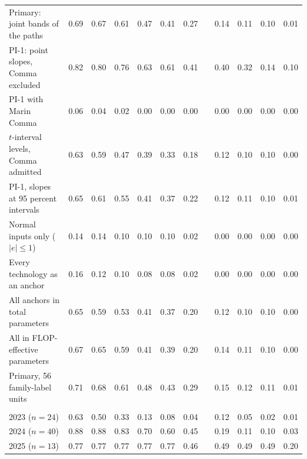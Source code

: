 \begin{table}[tp]
\begin{tabular*}{\textwidth}{@{\extracolsep{\fill}}lrrrrrrcrrrr@{}}
Primary: joint bands of the paths & 0.69 & 0.67 & 0.61 & 0.47 & 0.41 & 0.27 & & 0.14 & 0.11 & 0.10 & 0.01 \\
PI-1: point slopes, Comma excluded & 0.82 & 0.80 & 0.76 & 0.63 & 0.61 & 0.41 & & 0.40 & 0.32 & 0.14 & 0.10 \\
\quad PI-1 with Marin Comma & 0.06 & 0.04 & 0.02 & 0.00 & 0.00 & 0.00 & & 0.00 & 0.00 & 0.00 & 0.00 \\
$t$-interval levels, Comma admitted & 0.63 & 0.59 & 0.47 & 0.39 & 0.33 & 0.18 & & 0.12 & 0.10 & 0.10 & 0.00 \\
PI-1, slopes at 95 percent intervals & 0.65 & 0.61 & 0.55 & 0.41 & 0.37 & 0.22 & & 0.12 & 0.11 & 0.10 & 0.01 \\
Normal inputs only ($|e|\le1$) & 0.14 & 0.14 & 0.10 & 0.10 & 0.10 & 0.02 & & 0.00 & 0.00 & 0.00 & 0.00 \\
Every technology as an anchor & 0.16 & 0.12 & 0.10 & 0.08 & 0.08 & 0.02 & & 0.00 & 0.00 & 0.00 & 0.00 \\
All anchors in total parameters & 0.65 & 0.59 & 0.53 & 0.41 & 0.37 & 0.20 & & 0.12 & 0.10 & 0.10 & 0.00 \\
All in FLOP-effective parameters & 0.67 & 0.65 & 0.59 & 0.41 & 0.39 & 0.20 & & 0.14 & 0.11 & 0.10 & 0.00 \\
\quad Primary, 56 family-label units & 0.71 & 0.68 & 0.61 & 0.48 & 0.43 & 0.29 & & 0.15 & 0.12 & 0.11 & 0.01 \\
\addlinespace
\multicolumn{12}{@{}l}{\textit{Panel C. Primary, by release year (models)}} \\[1pt]
2023 ($n=24$) & 0.63 & 0.50 & 0.33 & 0.13 & 0.08 & 0.04 & & 0.12 & 0.05 & 0.02 & 0.01 \\
2024 ($n=40$) & 0.88 & 0.88 & 0.83 & 0.70 & 0.60 & 0.45 & & 0.19 & 0.11 & 0.10 & 0.03 \\
2025 ($n=13$) & 0.77 & 0.77 & 0.77 & 0.77 & 0.77 & 0.46 & & 0.49 & 0.49 & 0.49 & 0.20 \\
\bottomrule
\end{tabular*}
\par\smallskip
\begin{tablenotes}

\end{tablenotes}
\end{table}

